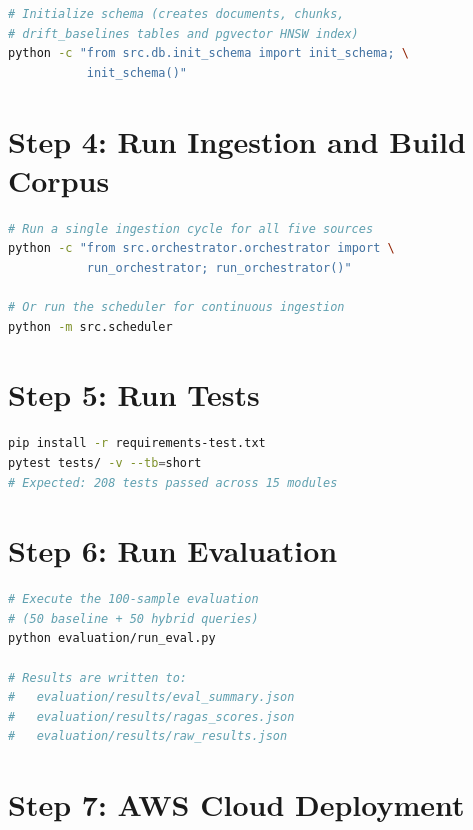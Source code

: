 \begin{lstlisting}[language=bash, basicstyle=\ttfamily\small]
# Initialize schema (creates documents, chunks,
# drift_baselines tables and pgvector HNSW index)
python -c "from src.db.init_schema import init_schema; \
           init_schema()"
\end{lstlisting}

\section*{Step 4: Run Ingestion and Build Corpus}

\begin{lstlisting}[language=bash, basicstyle=\ttfamily\small]
# Run a single ingestion cycle for all five sources
python -c "from src.orchestrator.orchestrator import \
           run_orchestrator; run_orchestrator()"

# Or run the scheduler for continuous ingestion
python -m src.scheduler
\end{lstlisting}

\section*{Step 5: Run Tests}

\begin{lstlisting}[language=bash, basicstyle=\ttfamily\small]
pip install -r requirements-test.txt
pytest tests/ -v --tb=short
# Expected: 208 tests passed across 15 modules
\end{lstlisting}

\section*{Step 6: Run Evaluation}

\begin{lstlisting}[language=bash, basicstyle=\ttfamily\small]
# Execute the 100-sample evaluation
# (50 baseline + 50 hybrid queries)
python evaluation/run_eval.py

# Results are written to:
#   evaluation/results/eval_summary.json
#   evaluation/results/ragas_scores.json
#   evaluation/results/raw_results.json
\end{lstlisting}

\section*{Step 7: AWS Cloud Deployment}

